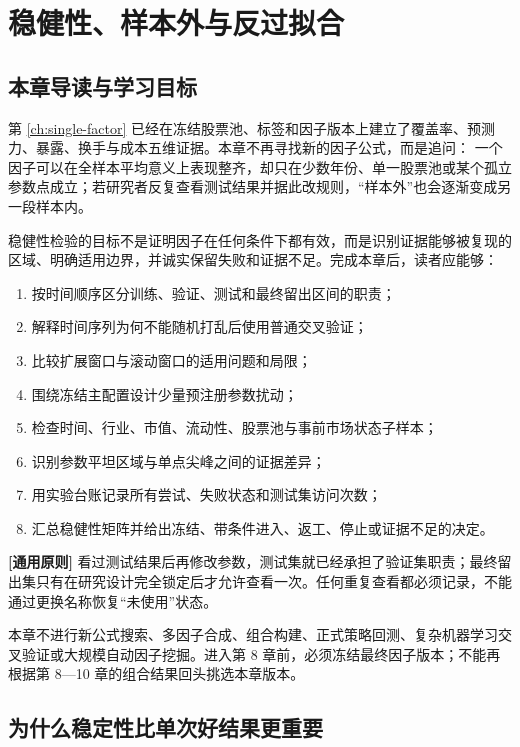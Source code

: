 \chapter{稳健性、样本外与反过拟合}
\label{ch:robustness}

\section{本章导读与学习目标}

第 \cref{ch:single-factor} 已经在冻结股票池、标签和因子版本上建立了覆盖率、预测力、暴露、换手与成本五维证据。本章不再寻找新的因子公式，而是追问： 一个因子可以在全样本平均意义上表现整齐，却只在少数年份、单一股票池或某个孤立参数点成立；若研究者反复查看测试结果并据此改规则，“样本外”也会逐渐变成另一段样本内。

稳健性检验的目标不是证明因子在任何条件下都有效，而是识别证据能够被复现的区域、明确适用边界，并诚实保留失败和证据不足。完成本章后，读者应能够：

\begin{enumerate}
  \item 按时间顺序区分训练、验证、测试和最终留出区间的职责；
  \item 解释时间序列为何不能随机打乱后使用普通交叉验证；
  \item 比较扩展窗口与滚动窗口的适用问题和局限；
  \item 围绕冻结主配置设计少量预注册参数扰动；
  \item 检查时间、行业、市值、流动性、股票池与事前市场状态子样本；
  \item 识别参数平坦区域与单点尖峰之间的证据差异；
  \item 用实验台账记录所有尝试、失败状态和测试集访问次数；
  \item 汇总稳健性矩阵并给出冻结、带条件进入、返工、停止或证据不足的决定。
\end{enumerate}

\begin{principlebox}
\textbf{[通用原则]} 看过测试结果后再修改参数，测试集就已经承担了验证集职责；最终留出集只有在研究设计完全锁定后才允许查看一次。任何重复查看都必须记录，不能通过更换名称恢复“未使用”状态。
\end{principlebox}

本章不进行新公式搜索、多因子合成、组合构建、正式策略回测、复杂机器学习交叉验证或大规模自动因子挖掘。进入第 8 章前，必须冻结最终因子版本；不能再根据第 8—10 章的组合结果回头挑选本章版本。

\section{为什么稳定性比单次好结果更重要}

